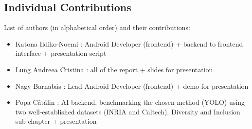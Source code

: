 \documentclass[runningheads,a4paper,11pt]{report}
\begin{document}
\begin{appendices}
\chapter{Individual Contributions}
List of authors (in alphabetical order) and their contributions:
\begin{itemize}
    \item Katona Ildiko-Noemi : Android Developer (frontend) + backend to frontend interface + presentation script
    \item Lung Andreea Cristina : all of the report + slides for presentation
    \item Nagy Barnab\' as : Lead Android Developer (frontend) + demo for presentation
    \item Popa C\v{a}t\v{a}lin : AI backend, benchmarking the chosen method (YOLO) using two well-established datasets (INRIA and Caltech), Diversity and Inclusion sub-chapter + presentation
\end{itemize}
\end{appendices}



\end{document}
